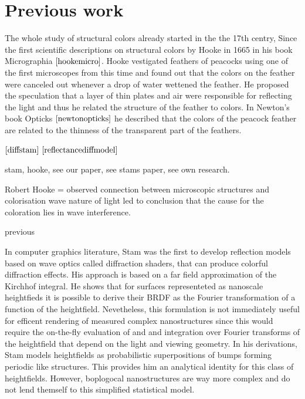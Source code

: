 \section{Previous work}
The whole study of structural colors already started in the the 17th centry, Since the first scientific descriptions on structural colors by Hooke in 1665 in his book Micrographia $\cite{hookemicro}$. Hooke vestigated feathers of peacocks using one of the first microscopes from this time and found out that the colors on the feather were canceled out whenever a drop of water wettened the feather. He proposed the speculation that a layer of thin plates and air were responsible for reflecting the light and thus he related the structure of the feather to colors. In Newton's book Opticks $\cite{newtonopticks}$ he described that the colors of the peacock feather are related to the thinness of the transparent part of the feathers. 









$\cite{diffstam}$
$\cite{reflectancediffmodel}$



stam, hooke, see our paper, see stams paper, see own research.


Robert Hooke = observed connection between microscopic structures and colorisation
wave nature of light led to conclusion that the cause for the coloration lies in wave interference.

previous

In computer graphics literature, Stam was the first to develop reflection models based on wave optics called diffraction shaders, that can produce colorful diffraction effects. His approach is based on a far field approximation of the Kirchhof integral. He shows that for surfaces representeted as nanoscale heightfieds it is possible to derive their BRDF as the Fourier transformation of a function of the heightfield. Nevetheless, this formulation is not immediately useful for efficent rendering of measured complex nanostructures since this would require the on-the-fly evaluation of and and integration over Fourier transforms of the heightfield that depend on the light and viewing geometry. In his derivations, Stam models heightfields as probabilistic superpositions of bumps forming periodic like structures. This provides him an analytical identity for this class of heightfields. However, boplogocal nanostructures are way more complex and do not lend themself to this simplified statistical model.

